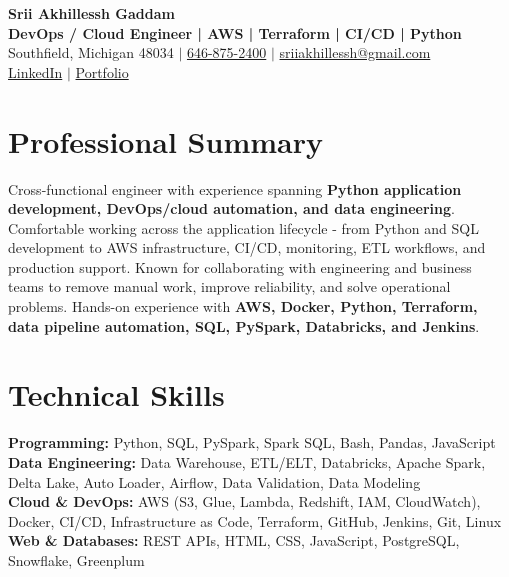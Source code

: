 \documentclass[letterpaper,10pt]{article}
\begin{document}
\fontsize{9.35pt}{10.45pt}\selectfont

\begin{center}
    {\LARGE \textbf{Srii Akhillessh Gaddam}} \\[-1pt]
    \textbf{DevOps / Cloud Engineer | AWS | Terraform | CI/CD | Python} \\[2pt]
    Southfield, Michigan 48034 $|$
    \href{tel:6468752400}{646-875-2400} $|$
    \href{mailto:sriiakhillessh@gmail.com}{sriiakhillessh@gmail.com} \\[1pt]
    \href{https://www.linkedin.com/in/srii-akhiilessh-gaddam-b48668191/}{LinkedIn} $|$
    \href{https://sriiakhillesshg.github.io/portfolio/}{Portfolio}
\end{center}
\vspace{-8pt}

\section{Professional Summary}
\small{Cross-functional engineer with experience spanning \textbf{Python application development, DevOps/cloud automation, and data engineering}. Comfortable working across the application lifecycle - from Python and SQL development to AWS infrastructure, CI/CD, monitoring, ETL workflows, and production support. Known for collaborating with engineering and business teams to remove manual work, improve reliability, and solve operational problems. Hands-on experience with \textbf{AWS, Docker, Python, Terraform, data pipeline automation, SQL, PySpark, Databricks, and Jenkins}.}

\section{Technical Skills}
\small{
\textbf{Programming:} Python, SQL, PySpark, Spark SQL, Bash, Pandas, JavaScript \\
\textbf{Data Engineering:} Data Warehouse, ETL/ELT, Databricks, Apache Spark, Delta Lake, Auto Loader, Airflow, Data Validation, Data Modeling \\
\textbf{Cloud \& DevOps:} AWS (S3, Glue, Lambda, Redshift, IAM, CloudWatch), Docker, CI/CD, Infrastructure as Code, Terraform, GitHub, Jenkins, Git, Linux \\
\textbf{Web \& Databases:} REST APIs, HTML, CSS, JavaScript, PostgreSQL, Snowflake, Greenplum
}
\end{document}
